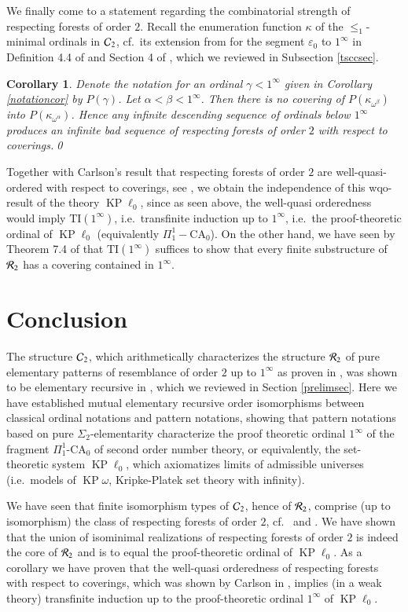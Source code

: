 \documentclass[3p,10pt,times]{elsarticle}
\newcommand{\al}{\alpha}
\newcommand{\be}{\beta}
\newcommand{\ga}{\gamma}
\newcommand{\epsn}{\varepsilon_0}
\newcommand{\ka}{\kappa}
\newcommand{\om}{\omega}
\newcommand{\leo}{\le_1}
\newcommand{\kpom}{{\operatorname{KP}\!\om}}
\newcommand{\kplnod}{{\operatorname{KP}\!\ell_0}}
\newcommand{\Rtwo}{{{\cal R}_2}}
\newcommand{\Ctwo}{{{\cal C}_2}}
\newtheorem{cor}[theo]{Corollary}
\newcommand{\oneinf}{1^\infty}
\begin{document}
We finally come to a statement regarding the combinatorial strength of respecting forests of order $2$. Recall the enumeration 
function $\ka$ of the $\leo$-minimal ordinals in $\Ctwo$, cf.\ its extension from \cite{C99} for the segment $\epsn$ to $\oneinf$ in 
Definition 4.4 of \cite{CWc} and Section 4 of \cite{W}, which we reviewed in Subsection \ref{tsccsec}.

\begin{cor} Denote the notation for an ordinal $\ga<\oneinf$ given in Corollary \ref{notationcor} by $P(\ga)$.
Let $\al<\be<\oneinf$. Then there is no covering of $P(\ka_{\om^\be})$ into $P(\ka_{\om^\al})$.
Hence any infinite descending sequence of ordinals below $\oneinf$ produces an infinite bad sequence of respecting forests of order $2$
with respect to coverings.\qed
\end{cor}

Together with Carlson's result that respecting forests of order $2$ are well-quasi-ordered with respect to coverings, 
see \cite{C16}, we obtain
the independence of this wqo-result of the theory $\kplnod$, since as seen above, the well-quasi orderedness would imply 
$\mathrm{TI}(\oneinf)$, i.e.\ transfinite induction up to $\oneinf$, i.e.\ the proof-theoretic ordinal of $\kplnod$ 
(equivalently $\Pi^1_1-\mathrm{CA}_0$).
On the other hand, we have seen by Theorem 7.4 of \cite{CWc} that $\mathrm{TI}(\oneinf)$ suffices to show that every finite substructure
of $\Rtwo$ has a covering contained in $\oneinf$.

\section{Conclusion}
The structure $\Ctwo$, which arithmetically characterizes the structure $\Rtwo$
of pure elementary patterns of resemblance of order $2$ up to $\oneinf$ as proven in \cite{CWc}, 
was shown to be elementary recursive in \cite{W}, which we reviewed in Section \ref{prelimsec}. 
Here we have established mutual elementary recursive order isomorphisms between classical ordinal notations and pattern notations,
showing that pattern notations based on pure $\Sigma_2$-elementarity characterize the proof theoretic ordinal $\oneinf$ of the fragment 
$\Pi^1_1$-$\mathrm{CA}_0$ of second order number theory, or equivalently, the set-theoretic system $\kplnod$, which axiomatizes 
limits of admissible universes (i.e.\ models of $\kpom$, Kripke-Platek set theory with infinity).  

We have seen that finite isomorphism types of $\Ctwo$, hence of $\Rtwo$, comprise (up to isomorphism) the 
class of respecting forests of order $2$, cf.\ \cite{C01} and \cite{C09}. 
We have shown that the union of isominimal realizations of respecting forests of order $2$ is indeed the core of $\Rtwo$ and 
is to equal the proof-theoretic ordinal of $\kplnod$.
As a corollary we have proven that the well-quasi orderedness of respecting forests with respect to coverings, 
which was shown by Carlson in \cite{C16}, implies (in a weak theory) transfinite induction up to the proof-theoretic ordinal $\oneinf$ of $\kplnod$.
\end{document}

